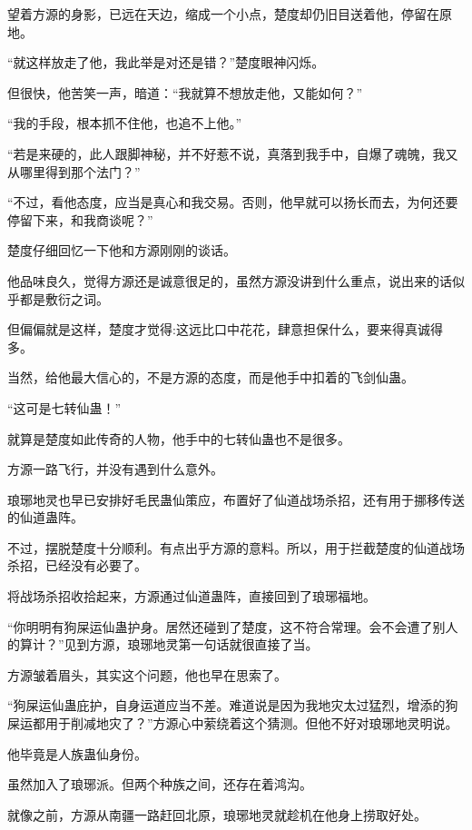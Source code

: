 
\begin{this_body}



望着方源的身影，已远在天边，缩成一个小点，楚度却仍旧目送着他，停留在原地。

“就这样放走了他，我此举是对还是错？”楚度眼神闪烁。

但很快，他苦笑一声，暗道：“我就算不想放走他，又能如何？”

“我的手段，根本抓不住他，也追不上他。”

“若是来硬的，此人跟脚神秘，并不好惹不说，真落到我手中，自爆了魂魄，我又从哪里得到那个法门？”

“不过，看他态度，应当是真心和我交易。否则，他早就可以扬长而去，为何还要停留下来，和我商谈呢？”

楚度仔细回忆一下他和方源刚刚的谈话。

他品味良久，觉得方源还是诚意很足的，虽然方源没讲到什么重点，说出来的话似乎都是敷衍之词。

但偏偏就是这样，楚度才觉得:这远比口中花花，肆意担保什么，要来得真诚得多。

当然，给他最大信心的，不是方源的态度，而是他手中扣着的飞剑仙蛊。

“这可是七转仙蛊！”

就算是楚度如此传奇的人物，他手中的七转仙蛊也不是很多。

方源一路飞行，并没有遇到什么意外。

琅琊地灵也早已安排好毛民蛊仙策应，布置好了仙道战场杀招，还有用于挪移传送的仙道蛊阵。

不过，摆脱楚度十分顺利。有点出乎方源的意料。所以，用于拦截楚度的仙道战场杀招，已经没有必要了。

将战场杀招收拾起来，方源通过仙道蛊阵，直接回到了琅琊福地。

“你明明有狗屎运仙蛊护身。居然还碰到了楚度，这不符合常理。会不会遭了别人的算计？”见到方源，琅琊地灵第一句话就很直接了当。

方源皱着眉头，其实这个问题，他也早在思索了。

“狗屎运仙蛊庇护，自身运道应当不差。难道说是因为我地灾太过猛烈，增添的狗屎运都用于削减地灾了？”方源心中萦绕着这个猜测。但他不好对琅琊地灵明说。

他毕竟是人族蛊仙身份。

虽然加入了琅琊派。但两个种族之间，还存在着鸿沟。

就像之前，方源从南疆一路赶回北原，琅琊地灵就趁机在他身上捞取好处。


\end{this_body}
